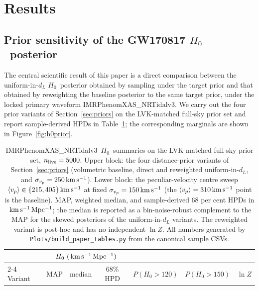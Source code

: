 \documentclass[usenatbib]{mnras}
\newcommand{\kmsmpc}{\ensuremath{\,\rm km\,s^{-1}\,Mpc^{-1}}\xspace}
\newcommand{\kms}{\ensuremath{\,\rm km\,s^{-1}}\xspace}
\newcommand{\hzero}{\ensuremath{H_{0}}\xspace}
\newcommand{\sigmavp}{\ensuremath{\sigma_{v_p}}\xspace}
\newcommand{\IMRX}{IMRPhenomXAS\_NRTidalv3\xspace}
\begin{document}
\section{Results}
\label{sec:results}

\subsection{Prior sensitivity of the GW170817 \hzero\ posterior}
\label{sec:prior}

The central scientific result of this paper is a direct comparison between the uniform-in-$d_L$ \hzero\ posterior obtained by sampling under the target prior and that obtained by reweighting the baseline posterior to the same target prior, under the locked primary waveform \IMRX. We carry out the four prior variants of Section~\ref{sec:priors} on the LVK-matched full-sky prior set and report sample-derived HPDs in Table~\ref{tab:h0priors}; the corresponding marginals are shown in Figure~\ref{fig:h0prior}.

\begin{table}
  \centering
  \caption{\IMRX\ \hzero\ summaries on the LVK-matched full-sky prior set, $n_{\rm live}=5000$. Upper block: the four distance-prior variants of Section~\ref{sec:priors} (volumetric baseline, direct and reweighted uniform-in-$d_L$, and $\sigmavp=250\kms$). Lower block: the peculiar-velocity centre sweep $\langle v_p\rangle\in\{215,405\}\kms$ at fixed $\sigmavp=150\kms$ (the $\langle v_p\rangle=310\kms$ point is the baseline). MAP, weighted median, and sample-derived 68 per cent HPDs in $\kmsmpc$; the median is reported as a bin-noise-robust complement to the MAP for the skewed posteriors of the uniform-in-$d_L$ variants. The reweighted variant is post-hoc and has no independent $\ln Z$. All numbers generated by \texttt{Plots/build\_paper\_tables.py} from the canonical sample CSVs.}
  \label{tab:h0priors}
  \begin{tabular}{lcccccc}
    \toprule
    & \multicolumn{3}{c}{$\hzero~(\kmsmpc)$} & & & \\
    \cmidrule(lr){2-4}
    Variant & MAP & median & 68\% HPD & $P(\hzero>120)$ & $P(\hzero>150)$ & $\ln Z$ \\
    \midrule

  \end{tabular}
\end{table}
\end{document}
